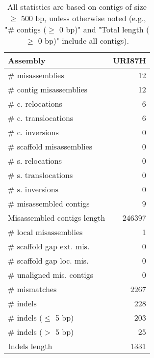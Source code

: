 \documentclass[12pt,a4paper]{article}
\begin{document}
\begin{table}[ht]
\begin{center}
\caption{All statistics are based on contigs of size $\geq$ 500 bp, unless otherwise noted (e.g., "\# contigs ($\geq$ 0 bp)" and "Total length ($\geq$ 0 bp)" include all contigs).}
\begin{tabular}{|l*{1}{|r}|}
\hline
Assembly & URI87H \\ \hline
\# misassemblies & 12 \\ \hline
\hspace{2mm}\# contig misassemblies & 12 \\ \hline
\hspace{5mm}\# c. relocations & 6 \\ \hline
\hspace{5mm}\# c. translocations & 6 \\ \hline
\hspace{5mm}\# c. inversions & 0 \\ \hline
\hspace{2mm}\# scaffold misassemblies & 0 \\ \hline
\hspace{5mm}\# s. relocations & 0 \\ \hline
\hspace{5mm}\# s. translocations & 0 \\ \hline
\hspace{5mm}\# s. inversions & 0 \\ \hline
\# misassembled contigs & 9 \\ \hline
Misassembled contigs length & 246397 \\ \hline
\# local misassemblies & 1 \\ \hline
\# scaffold gap ext. mis. & 0 \\ \hline
\# scaffold gap loc. mis. & 0 \\ \hline
\# unaligned mis. contigs & 0 \\ \hline
\# mismatches & 2267 \\ \hline
\# indels & 228 \\ \hline
\hspace{5mm}\# indels ($\leq$ 5 bp) & 203 \\ \hline
\hspace{5mm}\# indels ($>$ 5 bp) & 25 \\ \hline
Indels length & 1331 \\ \hline
\end{tabular}
\end{center}
\end{table}
\end{document}

